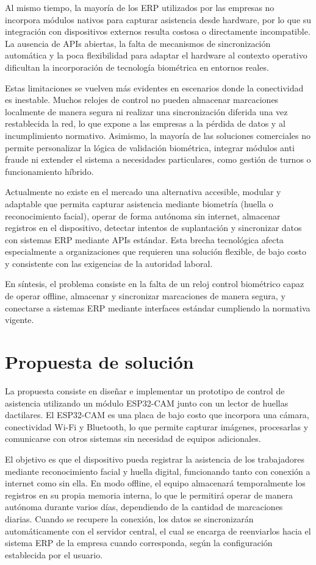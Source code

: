 \documentclass{iccmemoria}
\begin{document}
Al mismo tiempo, la mayoría de los ERP utilizados por las empresas no incorpora módulos nativos para capturar asistencia desde hardware, por lo que su integración con dispositivos externos resulta costosa o directamente incompatible. La ausencia de APIs abiertas, la falta de mecanismos de sincronización automática y la poca flexibilidad para adaptar el hardware al contexto operativo dificultan la incorporación de tecnología biométrica en entornos reales.

Estas limitaciones se vuelven más evidentes en escenarios donde la conectividad es inestable. Muchos relojes de control no pueden almacenar marcaciones localmente de manera segura ni realizar una sincronización diferida una vez restablecida la red, lo que expone a las empresas a la pérdida de datos y al incumplimiento normativo. Asimismo, la mayoría de las soluciones comerciales no permite personalizar la lógica de validación biométrica, integrar módulos anti fraude ni extender el sistema a necesidades particulares, como gestión de turnos o funcionamiento híbrido.

Actualmente no existe en el mercado una alternativa accesible, modular y adaptable que permita capturar asistencia mediante biometría (huella o reconocimiento facial), operar de forma autónoma sin internet, almacenar registros en el dispositivo, detectar intentos de suplantación y sincronizar datos con sistemas ERP mediante APIs estándar. Esta brecha tecnológica afecta especialmente a organizaciones que requieren una solución flexible, de bajo costo y consistente con las exigencias de la autoridad laboral.

En síntesis, el problema consiste en la falta de un reloj control biométrico capaz de operar offline, almacenar y sincronizar marcaciones de manera segura, y conectarse a sistemas ERP mediante interfaces estándar cumpliendo la normativa vigente.

\section{Propuesta de solución}
La propuesta consiste en diseñar e implementar un prototipo de control de asistencia utilizando un módulo ESP32-CAM junto con un lector de huellas dactilares. El ESP32-CAM es una placa de bajo costo que incorpora una cámara, conectividad Wi-Fi y Bluetooth, lo que permite capturar imágenes, procesarlas y comunicarse con otros sistemas sin necesidad de equipos adicionales.

El objetivo es que el dispositivo pueda registrar la asistencia de los trabajadores mediante reconocimiento facial y huella digital, funcionando tanto con conexión a internet como sin ella. En modo offline, el equipo almacenará temporalmente los registros en su propia memoria interna, lo que le permitirá operar de manera autónoma durante varios días, dependiendo de la cantidad de marcaciones diarias. Cuando se recupere la conexión, los datos se sincronizarán automáticamente con el servidor central, el cual se encarga de reenviarlos hacia el sistema ERP de la empresa cuando corresponda, según la configuración establecida por el usuario.
\end{document}
